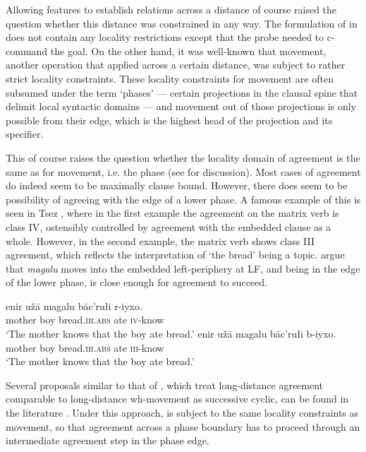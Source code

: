 \documentclass[output=paper
,modfonts
,nonflat]{langsci/langscibook}
\begin{document}
Allowing features to establish relations across a distance of course raised the question whether this distance was constrained in any way. The formulation of \agr {} in \citet{Chomsky2000,Chomsky2001} does not contain any locality restrictions except that the probe needed to c-command the goal. On the other hand, it was well-known that movement, another operation that applied across a certain distance, was subject to rather strict locality constraints.
These locality constraints for movement are often subsumed under the term `phases' --- certain projections in the clausal spine that delimit local syntactic domains --- and movement out of those projections is only possible from their edge, which is the highest head of the projection and its specifier.

This of course raises the question whether the locality domain of agreement is the same as for movement, i.e. the phase (see \citealp{bobaljikwurmbrand2005} for discussion).
Most cases of agreement do indeed seem to be maximally clause bound.
However, there does seem to be possibility of agreeing with the edge of a lower phase.
A famous example of this is seen in Tsez \citep{polinskypotsdam2001}, where in the first example the agreement on the matrix verb is class \textsc{IV}, ostensibly controlled by agreement with the embedded clause as a whole.
However, in the second example, the matrix verb shows class \textsc{III} agreement, which reflects the interpretation of `the bread' being a topic.
\citet{polinskypotsdam2001} argue that \textit{magalu} moves into the embedded left-periphery at LF, and being in the edge of the lower phase, is close enough for agreement to succeed.
\begin{exe}
	\ex
	\begin{xlist}
		\ex
		\gll enir u\v{z}ā magalu bāc'rułi r-iyxo.\\
		mother boy bread.\textsc{iii.abs} ate \textsc{iv}-know\\
		\glt `The mother knows that the boy ate bread.'
		\ex
		\gll enir u\v{z}ā magalu bāc'rułi b-iyxo.\\
		mother boy bread.\textsc{iii.abs} ate \textsc{iii}-know\\
		\glt `The mother knows that the boy ate bread.'
	\end{xlist}
\end{exe}
Several proposals similar to that of \cite{polinskypotsdam2001}, which treat long-distance agreement comparable to long-distance wh-movement as successive cyclic, can be found in the literature \citep{Legate2005,Frank2006,bjorkmanzeijlstra}.
Under this approach, \agr {} is subject to the same locality constraints as movement, so that agreement across a phase boundary has to proceed through an intermediate agreement step in the phase edge.
\end{document}
